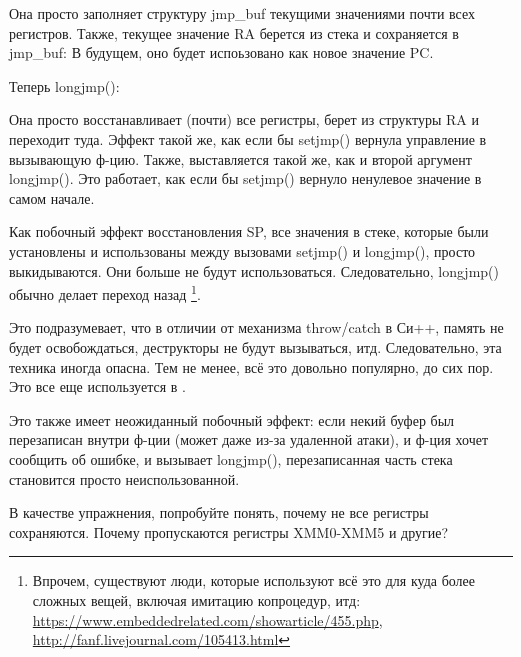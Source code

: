 Она просто заполняет структуру jmp\_buf текущими значениями почти всех регистров.
Также, текущее значение \ac{RA} берется из стека и сохраняется в jmp\_buf:
В будущем, оно будет испоьзовано как новое значение \ac{PC}.

Теперь longjmp():



Она просто восстанавливает (почти) все регистры, берет из структуры \ac{RA} и переходит туда.
Эффект такой же, как если бы setjmp() вернула управление в вызывающую ф-цию.
Также,  выставляется такой же, как и второй аргумент longjmp().
Это работает, как если бы setjmp() вернуло ненулевое значение в самом начале.

Как побочный эффект восстановления \ac{SP}, все значения в стеке, которые были установлены и использованы между
вызовами setjmp() и longjmp(), просто выкидываются.
Они больше не будут использоваться.
Следовательно, longjmp() обычно делает переход назад
\footnote{Впрочем, существуют люди, которые используют всё это для куда более сложных вещей, включая имитацию копроцедур, итд:
\url{https://www.embeddedrelated.com/showarticle/455.php},
\url{http://fanf.livejournal.com/105413.html}}.

Это подразумевает, что в отличии от механизма throw/catch в Си++, память не будет освобождаться,
деструкторы не будут вызываться, итд.
Следовательно, эта техника иногда опасна.
Тем не менее, всё это довольно популярно, до сих пор. Это все еще используется в \oracle.

Это также имеет неожиданный побочный эффект: если некий буфер был перезаписан внутри ф-ции (может даже из-за удаленной атаки),
и ф-ция хочет сообщить об ошибке, и вызывает longjmp(), перезаписанная часть стека становится просто неиспользованной.

В качестве упражнения, попробуйте понять, почему не все регистры сохраняются.
Почему пропускаются регистры XMM0-XMM5 и другие?

